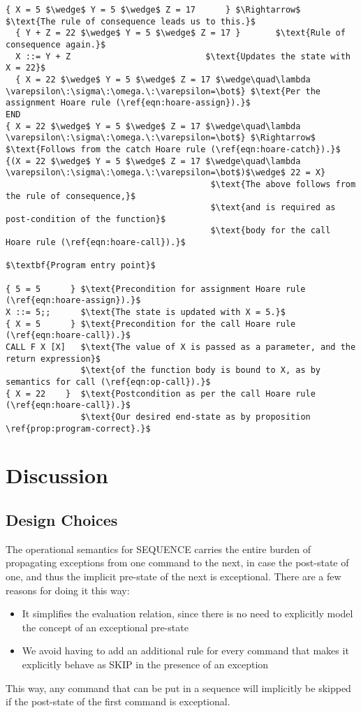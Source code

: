\begin{lstlisting}[mathescape=true,keepspaces=true,label=lst:hoare_ex_asgn,caption=Decorated variant of the program from listing \ref{lst:imp-plus-ex}.]
  { X = 5 $\wedge$ Y = 5 $\wedge$ Z = 17      } $\Rightarrow$    $\text{The rule of consequence leads us to this.}$
  { Y + Z = 22 $\wedge$ Y = 5 $\wedge$ Z = 17 }       $\text{Rule of consequence again.}$
  X ::= Y + Z                           $\text{Updates the state with X = 22}$
  { X = 22 $\wedge$ Y = 5 $\wedge$ Z = 17 $\wedge\quad\lambda \varepsilon\:\sigma\:\omega.\:\varepsilon=\bot$} $\text{Per the assignment Hoare rule (\ref{eqn:hoare-assign}).}$
END
{ X = 22 $\wedge$ Y = 5 $\wedge$ Z = 17 $\wedge\quad\lambda \varepsilon\:\sigma\:\omega.\:\varepsilon=\bot$} $\Rightarrow$ $\text{Follows from the catch Hoare rule (\ref{eqn:hoare-catch}).}$
{(X = 22 $\wedge$ Y = 5 $\wedge$ Z = 17 $\wedge\quad\lambda \varepsilon\:\sigma\:\omega.\:\varepsilon=\bot$)$\wedge$ 22 = X}
                                         $\text{The above follows from the rule of consequence,}$
                                         $\text{and is required as post-condition of the function}$
                                         $\text{body for the call Hoare rule (\ref{eqn:hoare-call}).}$

$\textbf{Program entry point}$

{ 5 = 5      } $\text{Precondition for assignment Hoare rule (\ref{eqn:hoare-assign}).}$
X ::= 5;;      $\text{The state is updated with X = 5.}$
{ X = 5      } $\text{Precondition for the call Hoare rule (\ref{eqn:hoare-call}).}$
CALL F X [X]   $\text{The value of X is passed as a parameter, and the return expression}$
               $\text{of the function body is bound to X, as by semantics for call (\ref{eqn:op-call}).}$
{ X = 22    }  $\text{Postcondition as per the call Hoare rule (\ref{eqn:hoare-call}).}$
               $\text{Our desired end-state as by proposition \ref{prop:program-correct}.}$
\end{lstlisting}

\section{Discussion}

\subsection{Design Choices}
The operational semantics for SEQUENCE carries the entire burden of propagating exceptions from one command to the next, in case the post-state of one, and thus the implicit pre-state of the next is exceptional. There are a few reasons for doing it this way:

\begin{itemize}
\item It simplifies the evaluation relation, since there is no need to explicitly model the concept of an exceptional pre-state
\item We avoid having to add an additional rule for every command that makes it explicitly behave as SKIP in the presence of an exception
\end{itemize}

This way, any command that can be put in a sequence will implicitly be skipped if the post-state of the first command is exceptional.

